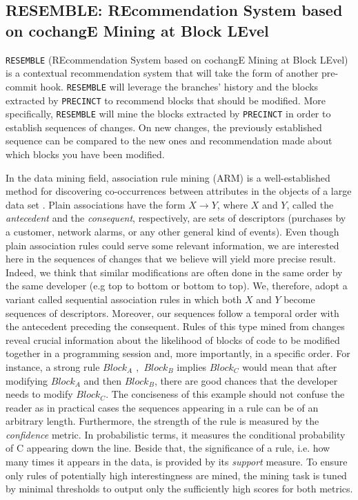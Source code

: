 
\subsection{RESEMBLE: REcommendation System based on cochangE Mining at Block LEvel\label{sec:RESEMBLE}}

{\tt RESEMBLE} (REcommendation System based on cochangE Mining at Block LEvel) is a contextual recommendation system that will take the form of another pre-commit hook. {\tt RESEMBLE} will leverage the branches' history and the blocks extracted by {\tt PRECINCT} to recommend blocks that should be modified.
More specifically, {\tt RESEMBLE} will mine the blocks extracted by {\tt PRECINCT}  in order to establish sequences of changes.
On new changes, the previously established sequence can be compared to the new ones and recommendation made about which blocks you have been modified.

In the data mining field, association rule mining (ARM) is a
well-established method for discovering co-occurrences between attributes
in the objects of a large data set \cite{Gregory1991,HEIKKI1997}. Plain
associations have the form $X \rightarrow Y$, where $X$ and $Y$,
called the \textit{antecedent} and the \textit{consequent}, respectively, are sets of descriptors
(purchases by a customer, network alarms, or any other general kind of events).
Even though plain association rules could serve some relevant information, we are interested here in
the sequences of changes that we believe will yield more precise result. Indeed, we think that similar modifications are often done in the same order by the same developer (e.g top to bottom or bottom to top).
We, therefore, adopt a variant called sequential association rules in which
both $X$ and $Y$ become sequences of descriptors.
Moreover, our sequences follow a temporal order with the antecedent preceding the consequent.
Rules of this type mined from changes reveal crucial
information about the likelihood of blocks of code to be modified together in a programming session
and, more importantly, in a specific order.
For instance, a strong rule \emph{$Block_A$ $,$ $Block_B$} implies \emph{$Block_C$} would mean that after modifying $Block_A$ and then $Block_B$, there are good chances that the developer needs to modify $Block_C$.
The conciseness of this example should not confuse the reader as in practical cases
the sequences appearing in a rule can be of an arbitrary length.
Furthermore, the strength of the rule is measured by the \textit{confidence} metric.
In probabilistic terms,
it measures the conditional probability of C appearing down the line.
Beside that, the significance of a rule, i.e. how many times it appears in the data, is provided by its \textit{support} measure.
To ensure only rules of potentially high interestingness are mined,
the mining task is tuned by minimal thresholds to
output only the sufficiently high scores for both metrics.


